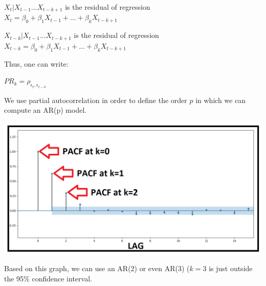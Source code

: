 $X_t | X_{t-1} ... X_{t-k+1}$ is the residual of regression $X_t = \beta_0 + \beta_1 X_{t-1} + ... + \beta_k X_{t-k+1}$

$X_{t-k} | X_{t-1} ... X_{t-k+1}$ is the residual of regression $X_{t-k} = \beta_0 + \beta_1 X_{t-1} + ... + \beta_k X_{t-k+1}$

\vspace{5mm}

Thus, one can write:

\begin{center}
$PR_k = \rho_{\epsilon_t,\epsilon_{t-k}}$
\end{center}

\vspace{5mm}

We use partial autocorrelation in order to define the order $p$ in which we can compute an AR(p) model.

\begin{center}
\includegraphics[scale=0.2]{PACF.png}
\end{center}

\vspace{5mm}

Based on this graph, we can use an AR(2) or even AR(3) ($k=3$ is just outside the 95\% confidence interval.

\vspace{5mm}
